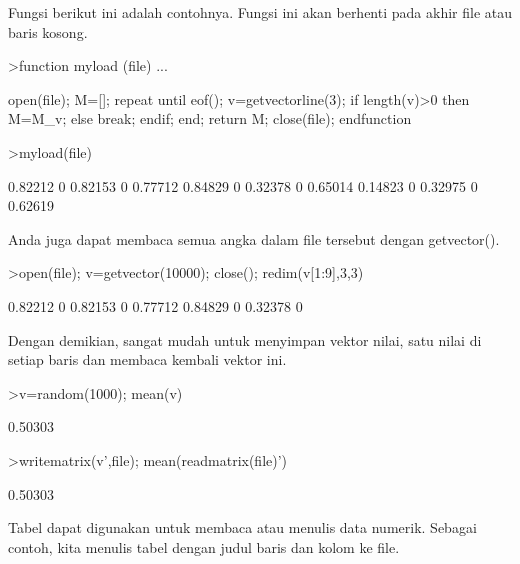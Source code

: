 \documentclass[a4paper,10pt]{article}
\begin{document}
\begin{eulernotebook}
\begin{eulercomment}
\begin{eulercomment}
\begin{eulercomment}
\begin{eulercomment}
\begin{eulercomment}
\begin{eulercomment}
\begin{eulercomment}
Fungsi berikut ini adalah contohnya. Fungsi ini akan berhenti pada
akhir file atau baris kosong.
\end{eulercomment}
\begin{eulerprompt}
>function myload (file) ...
\end{eulerprompt}
\begin{eulerudf}
  open(file);
  M=[];
  repeat
     until eof();
     v=getvectorline(3);
     if length(v)>0 then M=M_v; else break; endif;
  end;
  return M;
  close(file);
  endfunction
\end{eulerudf}
\begin{eulerprompt}
>myload(file)
\end{eulerprompt}
\begin{euleroutput}
    0.82212         0   0.82153         0   0.77712 
    0.84829         0   0.32378         0   0.65014 
    0.14823         0   0.32975         0   0.62619 
\end{euleroutput}
\begin{eulercomment}
Anda juga dapat membaca semua angka dalam file tersebut dengan
getvector().
\end{eulercomment}
\begin{eulerprompt}
>open(file); v=getvector(10000); close(); redim(v[1:9],3,3)
\end{eulerprompt}
\begin{euleroutput}
    0.82212         0   0.82153 
          0   0.77712   0.84829 
          0   0.32378         0 
\end{euleroutput}
\begin{eulercomment}
Dengan demikian, sangat mudah untuk menyimpan vektor nilai, satu nilai
di setiap baris dan membaca kembali vektor ini.
\end{eulercomment}
\begin{eulerprompt}
>v=random(1000); mean(v)
\end{eulerprompt}
\begin{euleroutput}
  0.50303
\end{euleroutput}
\begin{eulerprompt}
>writematrix(v',file); mean(readmatrix(file)')
\end{eulerprompt}
\begin{euleroutput}
  0.50303
\end{euleroutput}
\begin{eulercomment}
Tabel dapat digunakan untuk membaca atau menulis data numerik. Sebagai
contoh, kita menulis tabel dengan judul baris dan kolom ke file.

\end{eulercomment}
\end{eulercomment}
\end{eulercomment}
\end{eulercomment}
\end{eulercomment}
\end{eulercomment}
\end{eulercomment}
\end{eulernotebook}
\end{document}
